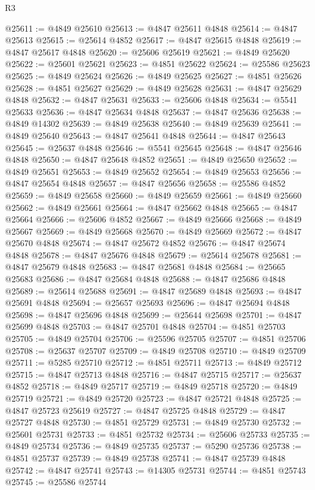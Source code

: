 \begin{lexlean}{R3}
\begin{coremodule}
@25611 := @4849 @25610
@25613 := @4847 @25611 @4848
@25614 := @4847 @25613
@25615 := @25614 @4852
@25617 := @4847 @25615 @4848
@25619 := @4847 @25617 @4848
@25620 := @25606 @25619
@25621 := @4849 @25620
@25622 := @25601 @25621
@25623 := @4851 @25622
@25624 := @25586 @25623
@25625 := @4849 @25624
@25626 := @4849 @25625
@25627 := @4851 @25626
@25628 := @4851 @25627
@25629 := @4849 @25628
@25631 := @4847 @25629 @4848
@25632 := @4847 @25631
@25633 := @25606 @4848
@25634 := @5541 @25633
@25636 := @4847 @25634 @4848
@25637 := @4847 @25636
@25638 := @4849 @14302
@25639 := @4849 @25638
@25640 := @4849 @25639
@25641 := @4849 @25640
@25643 := @4847 @25641 @4848
@25644 := @4847 @25643
@25645 := @25637 @4848
@25646 := @5541 @25645
@25648 := @4847 @25646 @4848
@25650 := @4847 @25648 @4852
@25651 := @4849 @25650
@25652 := @4849 @25651
@25653 := @4849 @25652
@25654 := @4849 @25653
@25656 := @4847 @25654 @4848
@25657 := @4847 @25656
@25658 := @25586 @4852
@25659 := @4849 @25658
@25660 := @4849 @25659
@25661 := @4849 @25660
@25662 := @4849 @25661
@25664 := @4847 @25662 @4848
@25665 := @4847 @25664
@25666 := @25606 @4852
@25667 := @4849 @25666
@25668 := @4849 @25667
@25669 := @4849 @25668
@25670 := @4849 @25669
@25672 := @4847 @25670 @4848
@25674 := @4847 @25672 @4852
@25676 := @4847 @25674 @4848
@25678 := @4847 @25676 @4848
@25679 := @25614 @25678
@25681 := @4847 @25679 @4848
@25683 := @4847 @25681 @4848
@25684 := @25665 @25683
@25686 := @4847 @25684 @4848
@25688 := @4847 @25686 @4848
@25689 := @25614 @25688
@25691 := @4847 @25689 @4848
@25693 := @4847 @25691 @4848
@25694 := @25657 @25693
@25696 := @4847 @25694 @4848
@25698 := @4847 @25696 @4848
@25699 := @25644 @25698
@25701 := @4847 @25699 @4848
@25703 := @4847 @25701 @4848
@25704 := @4851 @25703
@25705 := @4849 @25704
@25706 := @25596 @25705
@25707 := @4851 @25706
@25708 := @25637 @25707
@25709 := @4849 @25708
@25710 := @4849 @25709
@25711 := @5285 @25710
@25712 := @4851 @25711
@25713 := @4849 @25712
@25715 := @4847 @25713 @4848
@25716 := @4847 @25715
@25717 := @25637 @4852
@25718 := @4849 @25717
@25719 := @4849 @25718
@25720 := @4849 @25719
@25721 := @4849 @25720
@25723 := @4847 @25721 @4848
@25725 := @4847 @25723 @25619
@25727 := @4847 @25725 @4848
@25729 := @4847 @25727 @4848
@25730 := @4851 @25729
@25731 := @4849 @25730
@25732 := @25601 @25731
@25733 := @4851 @25732
@25734 := @25606 @25733
@25735 := @4849 @25734
@25736 := @4849 @25735
@25737 := @5290 @25736
@25738 := @4851 @25737
@25739 := @4849 @25738
@25741 := @4847 @25739 @4848
@25742 := @4847 @25741
@25743 := @14305 @25731
@25744 := @4851 @25743
@25745 := @25586 @25744

\end{coremodule}
\end{lexlean}
